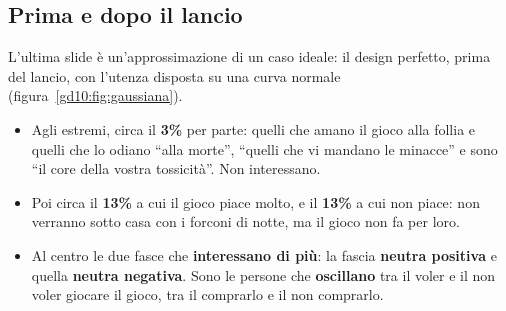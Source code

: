\subsection{Prima e dopo il lancio}

L'ultima slide è un'approssimazione di un caso ideale: il design perfetto,
prima del lancio, con l'utenza disposta su una curva normale
(figura~\ref{gd10:fig:gaussiana}).
\begin{itemize}
  \item Agli estremi, circa il \textbf{3\%} per parte: quelli che amano il
        gioco alla follia e quelli che lo odiano ``alla morte'', ``quelli
        che vi mandano le minacce'' e sono ``il core della vostra
        tossicità''. Non interessano.
  \item Poi circa il \textbf{13\%} a cui il gioco piace molto, e il
        \textbf{13\%} a cui non piace: non verranno sotto casa con i forconi
        di notte, ma il gioco non fa per loro.
  \item Al centro le due fasce che \textbf{interessano di più}: la fascia
        \textbf{neutra positiva} e quella \textbf{neutra negativa}. Sono le
        persone che \textbf{oscillano} tra il voler e il non voler giocare il
        gioco, tra il comprarlo e il non comprarlo.
\end{itemize}

